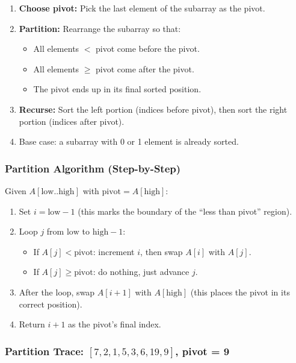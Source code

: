 \documentclass[12pt,portrait]{article}
\begin{document}
\begin{rulebox}
\begin{enumerate}[leftmargin=*]
    \item \textbf{Choose pivot:} Pick the last element of the subarray as the pivot.
    \item \textbf{Partition:} Rearrange the subarray so that:
    \begin{itemize}[leftmargin=*]
        \item All elements $<$ pivot come before the pivot.
        \item All elements $\geq$ pivot come after the pivot.
        \item The pivot ends up in its final sorted position.
    \end{itemize}
    \item \textbf{Recurse:} Sort the left portion (indices before pivot), then sort the right portion (indices after pivot).
    \item Base case: a subarray with 0 or 1 element is already sorted.
\end{enumerate}
\end{rulebox}

\subsubsection{Partition Algorithm (Step-by-Step)}

Given $A[\text{low}..\text{high}]$ with $\text{pivot} = A[\text{high}]$:
\begin{enumerate}[leftmargin=*]
    \item Set $i = \text{low} - 1$ (this marks the boundary of the ``less than pivot'' region).
    \item Loop $j$ from $\text{low}$ to $\text{high}-1$:
    \begin{itemize}[leftmargin=*]
        \item If $A[j] < \text{pivot}$: increment $i$, then swap $A[i]$ with $A[j]$.
        \item If $A[j] \geq \text{pivot}$: do nothing, just advance $j$.
    \end{itemize}
    \item After the loop, swap $A[i+1]$ with $A[\text{high}]$ (this places the pivot in its correct position).
    \item Return $i+1$ as the pivot's final index.
\end{enumerate}

\subsubsection{Partition Trace: $[7,2,1,5,3,6,19,9]$, pivot = 9}
\end{document}
